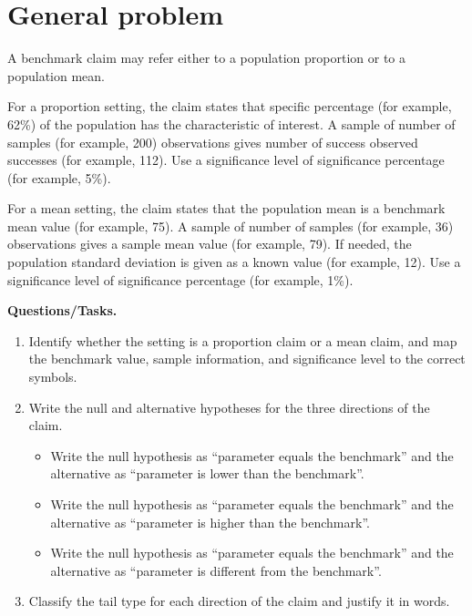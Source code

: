 	\section*{General problem}
	A benchmark claim may refer either to a population proportion or to a population mean.
	
	For a proportion setting, the claim states that specific percentage (for example, 62\%) of the population has the characteristic of interest. A sample of number of samples (for example, 200) observations gives number of success observed successes (for example, 112). Use a significance level of significance percentage (for example, 5\%).
	
	For a mean setting, the claim states that the population mean is a benchmark mean value (for example, 75). A sample of number of samples (for example, 36) observations gives a sample mean value (for example, 79). If needed, the population standard deviation is given as a known value (for example, 12). Use a significance level of significance percentage (for example, 1\%).
	
	\textbf{Questions/Tasks.}
	\begin{enumerate}
		\item[(C1)] Identify whether the setting is a proportion claim or a mean claim, and map the benchmark value, sample information, and significance level to the correct symbols.
		\item[(C2)] Write the null and alternative hypotheses for the three directions of the claim.
		\begin{itemize}
			\item[(a)] Write the null hypothesis as ``parameter equals the benchmark'' and the alternative as ``parameter is lower than the benchmark''.
			\item[(b)] Write the null hypothesis as ``parameter equals the benchmark'' and the alternative as ``parameter is higher than the benchmark''.
			\item[(c)] Write the null hypothesis as ``parameter equals the benchmark'' and the alternative as ``parameter is different from the benchmark''.
		\end{itemize}
		\item[(C3)] Classify the tail type for each direction of the claim and justify it in words.
	\end{enumerate}
	
